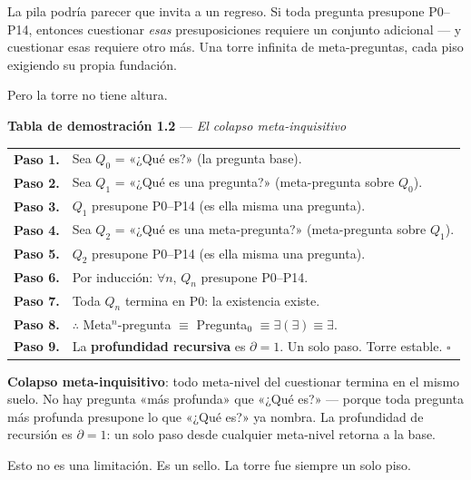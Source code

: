 \documentclass[10pt, openany, oneside]{book}
\begin{document}
La pila podría parecer que invita a un regreso. Si toda pregunta presupone P0--P14, entonces cuestionar \textit{esas} presuposiciones requiere un conjunto adicional --- y cuestionar esas requiere otro más. Una torre infinita de meta-preguntas, cada piso exigiendo su propia fundación.

Pero la torre no tiene altura.

\textbf{Tabla de demostración 1.2} --- \textit{El colapso meta-inquisitivo}

\vspace{0.5em}

\noindent\begin{tabular}{r p{}}
\textbf{Paso 1.} & Sea $Q_0$ = «¿Qué es?» (la pregunta base). \\[0.3em]
\textbf{Paso 2.} & Sea $Q_1$ = «¿Qué es una pregunta?» (meta-pregunta sobre $Q_0$). \\[0.3em]
\textbf{Paso 3.} & $Q_1$ presupone P0--P14 (es ella misma una pregunta). \\[0.3em]
\textbf{Paso 4.} & Sea $Q_2$ = «¿Qué es una meta-pregunta?» (meta-pregunta sobre $Q_1$). \\[0.3em]
\textbf{Paso 5.} & $Q_2$ presupone P0--P14 (es ella misma una pregunta). \\[0.3em]
\textbf{Paso 6.} & Por inducción: $\forall n$, $Q_n$ presupone P0--P14. \\[0.3em]
\textbf{Paso 7.} & Toda $Q_n$ termina en P0: la existencia existe. \\[0.3em]
\textbf{Paso 8.} & $\therefore$ Meta$^n$-pregunta $\equiv$ Pregunta$_0$ $\equiv \exists(\exists) \equiv \exists$. \\[0.3em]
\textbf{Paso 9.} & La \textbf{profundidad recursiva} es $\partial = 1$. Un solo paso. Torre estable. $\square$ \\[0.3em]
\end{tabular}

\vspace{0.8em}

\noindent \textbf{Colapso meta-inquisitivo}: todo meta-nivel del cuestionar termina en el mismo suelo. No hay pregunta «más profunda» que «¿Qué es?» --- porque toda pregunta más profunda presupone lo que «¿Qué es?» ya nombra. La profundidad de recursión es $\partial = 1$: un solo paso desde cualquier meta-nivel retorna a la base.

Esto no es una limitación. Es un sello. La torre fue siempre un solo piso.

\vspace{1.5em}
\end{document}
